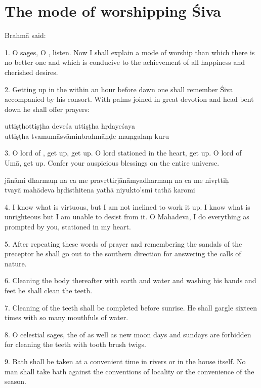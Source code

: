 \chapter{The mode of worshipping Śiva}

Brahmā said:

1. O sages, O , listen. Now I shall explain a mode of worship than
which there is no better one and which is conducive to the achievement of all
happiness and cherished desires.

2. Getting up in the  within an hour before dawn one shall
remember Śiva accompanied by his consort. With palms joined in great devotion
and head bent down he shall offer prayers:

\begin{shloka}
  uttiṣṭhottiṣṭha deveśa uttiṣṭha hṛdayeśaya\\
  uttiṣṭha tvamumāsvāminbrahmāṇḍe maṃgalaṃ kuru
\end{shloka}

3. O lord of , get up, get up. O lord stationed in the heart, get up.
O lord of Umā, get up. Confer your auspicious blessings on the entire universe.

\begin{shloka}
  jānāmi dharmaṃ na ca me pravṛttirjānāmyadharmaṃ na ca me nivṛttiḥ\\
  tvayā mahādeva hṛdisthitena yathā niyukto'smi tathā karomi
\end{shloka}

4. I know what is virtuous, but I am not inclined to work it up. I know what is
unrighteous but I am unable to desist from it. O Mahādeva, I do everything as
prompted by you, stationed in my heart.

5. After repeating these words of prayer and remembering the sandals of
the preceptor he shall go out to the southern direction for answering the calls
of nature.

6. Cleaning the body thereafter with earth and water and washing his hands and
feet he shall clean the teeth.

7. Cleaning of the teeth shall be completed before sunrise. He shall gargle
sixteen times with so many mouthfuls of water.

8. O celestial sages, the  of  as well as new moon
days and sundays are forbidden for cleaning the teeth with tooth brush twigs.

9. Bath shall be taken at a convenient time in rivers or in the house itself. No
man shall take bath against the conventions of locality or the convenience of
the season.

